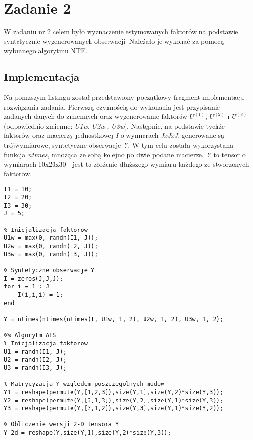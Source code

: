 \section{Zadanie 2}

W zadaniu nr 2 celem było wyznaczenie estymowanych faktorów na podstawie syntetycznie wygenerowanych obserwacji. Należało je wykonać za pomocą wybranego algorytmu NTF.

\subsection{Implementacja}

Na poniższym listingu został przedstawiony początkowy fragment implementacji rozwiązania zadania. Pierwszą czynnością do wykonania jest przypisanie zadanych danych do zmiennych oraz wygenerowanie faktorów $U^{(1)}$, $U^{(2)}$ i $U^{(3)}$ (odpowiednio zmienne: \textit{U1w}, \textit{U2w} i \textit{U3w}). Następnie, na podstawie tychże faktorów oraz macierzy jednostkowej \textit{I} o wymiarach \textit{JxJxJ}, generowane są trójwymiarowe, syntetyczne obserwacje \textit{Y}. W tym celu została wykorzystana funkcja \textit{ntimes}, mnożąca ze sobą kolejno po dwie podane macierze. \textit{Y} to tensor o wymiarach 10x20x30 - jest to złożenie dłuższego wymiaru każdego ze stworzonych faktorów. \\

\begin{minipage}{\linewidth}
\begin{lstlisting}[linewidth=14.5cm]
% Dane
I1 = 10;
I2 = 20;
I3 = 30;
J = 5;

% Inicjalizacja faktorow
U1w = max(0, randn(I1, J));
U2w = max(0, randn(I2, J));
U3w = max(0, randn(I3, J));

% Syntetyczne obserwacje Y 
I = zeros(J,J,J);
for i = 1 : J
	I(i,i,i) = 1;   
end

Y = ntimes(ntimes(ntimes(I, U1w, 1, 2), U2w, 1, 2), U3w, 1, 2);

%% Algorytm ALS
% Inicjalizacja faktorow
U1 = randn(I1, J);
U2 = randn(I2, J);
U3 = randn(I3, J);

% Matrycyzacja Y wzgledem poszczegolnych modow
Y1 = reshape(permute(Y,[1,2,3]),size(Y,1),size(Y,2)*size(Y,3));
Y2 = reshape(permute(Y,[2,1,3]),size(Y,2),size(Y,1)*size(Y,3));
Y3 = reshape(permute(Y,[3,1,2]),size(Y,3),size(Y,1)*size(Y,2));

% Obliczenie wersji 2-D tensora Y
Y_2d = reshape(Y,size(Y,1),size(Y,2)*size(Y,3));
\end{lstlisting}
\end{minipage}
\vspace{5mm}

